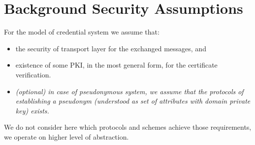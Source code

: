 \section{Background Security Assumptions}
For the model of credential system we assume that:
\begin{itemize}
    \item the security of transport layer for the exchanged messages, and
    \item existence of some PKI, in the most general form, for the certificate verification.
    \item \textit{(optional) in case of pseudonymous system, we assume that the protocols of establishing a pseudonym (understood as set of attributes with domain private key) exists. }
\end{itemize}
We do not consider here which protocols and schemes achieve those requirements, we operate on higher level of abstraction.





